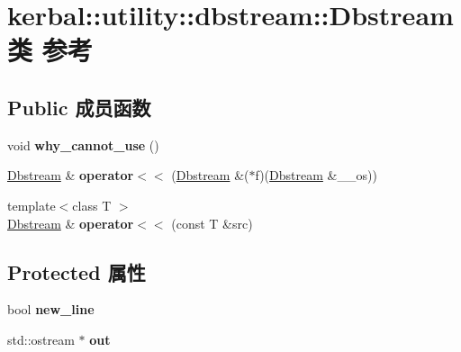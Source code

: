 \hypertarget{classkerbal_1_1utility_1_1dbstream_1_1_dbstream}{}\section{kerbal\+:\+:utility\+:\+:dbstream\+:\+:Dbstream类 参考}
\label{classkerbal_1_1utility_1_1dbstream_1_1_dbstream}
\subsection*{Public 成员函数}
\begin{DoxyCompactItemize}
\item 
\mbox{\label{classkerbal_1_1utility_1_1dbstream_1_1_dbstream_ad501a9dcfa12e58087aaa6160807dcb5}} 
void {\bfseries why\+\_\+cannot\+\_\+use} ()
\item 
\mbox{\label{classkerbal_1_1utility_1_1dbstream_1_1_dbstream_a52874fb8efe85a4863062985062ae07c}} 
\hyperlink{classkerbal_1_1utility_1_1dbstream_1_1_dbstream}{Dbstream} \& {\bfseries operator$<$$<$} (\hyperlink{classkerbal_1_1utility_1_1dbstream_1_1_dbstream}{Dbstream} \&($\ast$f)(\hyperlink{classkerbal_1_1utility_1_1dbstream_1_1_dbstream}{Dbstream} \&\+\_\+\+\_\+os))
\item 
\mbox{\label{classkerbal_1_1utility_1_1dbstream_1_1_dbstream_a3a46b3ca98efb29d04b9fb22c05b9770}} 
{\footnotesize template$<$class T $>$ }\\\hyperlink{classkerbal_1_1utility_1_1dbstream_1_1_dbstream}{Dbstream} \& {\bfseries operator$<$$<$} (const T \&src)
\end{DoxyCompactItemize}
\subsection*{Protected 属性}
\begin{DoxyCompactItemize}
\item 
\mbox{\label{classkerbal_1_1utility_1_1dbstream_1_1_dbstream_a7dcd1821b6f4a0272fd3df7cc98b082f}} 
bool {\bfseries new\+\_\+line}
\item 
\mbox{\label{classkerbal_1_1utility_1_1dbstream_1_1_dbstream_abf779f086ab72ef62e1a65676080024e}} 
std\+::ostream $\ast$ {\bfseries out}
\end{DoxyCompactItemize}
